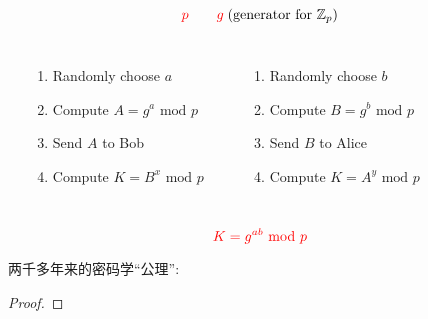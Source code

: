 \begin{frame}
  \[
	\textcolor{red}{p} \qquad \textcolor{red}{g} \;\text{(generator for $\mathbb{Z}_{p}$)} 
  \]

  \pause
  \begin{columns}
	  \begin{center}
	  \end{center}

	  \begin{enumerate}
		\setlength{\itemsep}{6pt}
		\item Randomly choose $a$
		\item Compute $A = g^a \text{ mod } p$
		\item Send $A$ to Bob
		\item Compute $K = B^x \text{ mod } p$
	  \end{enumerate}
	  \begin{center}
	  \end{center}

	  \begin{enumerate}
		\setlength{\itemsep}{6pt}
		\item Randomly choose $b$
		\item Compute $B = g^b \text{ mod } p$
		\item Send $B$ to Alice 
		\item Compute $K = A^y \text{ mod } p$
	  \end{enumerate}
  \end{columns}

  \pause
  \vspace{0.60cm}
  \[
	\textcolor{red}{K = g^{ab} \text{ mod } p}
  \]

  \pause
  \begin{center}
  \end{center}
\end{frame}

\begin{frame}

  \begin{center}
  \end{center}
\end{frame}

\begin{frame}

  \begin{center}
  \end{center}
\end{frame}

\begin{frame}
  \begin{alertblock}{两千多年来的密码学``公理'':}
	\centering
  \end{alertblock}

  \pause
  \begin{proof}
  \end{proof}
\end{frame}
